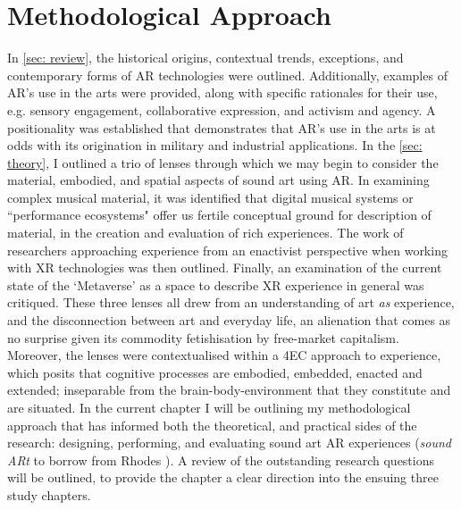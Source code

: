 \section{Methodological Approach}\label{sec: method-methods}
In \autoref{sec: review}, the historical origins, contextual trends, exceptions, and contemporary forms of AR technologies were outlined. Additionally, examples of AR's use in the arts were provided, along with specific rationales for their use, e.g. sensory engagement, collaborative expression, and activism and agency. A positionality was established that demonstrates that AR's use in the arts is at odds with its origination in military and industrial applications. In the \autoref{sec: theory}, I outlined a trio of lenses through which we may begin to consider the material, embodied, and spatial aspects of sound art using AR. In examining complex musical material, it was identified that digital musical systems or ``performance ecosystems" offer us fertile conceptual ground for description of material, in the creation and evaluation of rich experiences. The work of researchers approaching experience from an enactivist perspective when working with XR technologies was then outlined. Finally, an examination of the current state of the `Metaverse' as a space to describe XR experience in general was critiqued. These three lenses all drew from an understanding of art \textit{as} experience, and the disconnection between art and everyday life, an alienation that comes as no surprise given its commodity fetishisation by free-market capitalism. Moreover, the lenses were contextualised within a 4EC approach to experience, which posits that cognitive processes are embodied, embedded, enacted and extended; inseparable from the brain-body-environment that they constitute and are situated. In the current chapter I will be outlining my methodological approach that has informed both the theoretical, and practical sides of the research: designing, performing, and evaluating sound art AR experiences (\textit{sound ARt} to borrow from Rhodes \citeyearpar{rhodes2018}). A review of the outstanding research questions will be outlined, to provide the chapter a clear direction into the ensuing three study chapters.

\begin{enumerate}
    \RQmedium
    \RQexperience
\end{enumerate}

